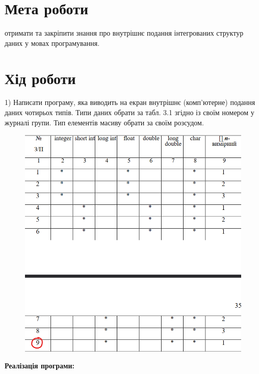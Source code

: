 \section{Мета роботи}
отримати та закріпити знання про внутрішнє подання інтегрованих структур даних у мовах програмування.

\section{Хід роботи}
1) Написати програму, яка виводить на екран внутрішнє (комп’ютерне)
подання даних чотирьох типів. Типи даних обрати за табл. 3.1 згідно із своїм
номером у журналі групи. Тип елементів масиву обрати за своїм розсудом.

\begin{figure}[h!]
    \centering
    \includegraphics[width=16cm]{reports/algos/lab3/assets/1.png}
\end{figure}

\clearpage
\textbf{Реалізація програми:}

